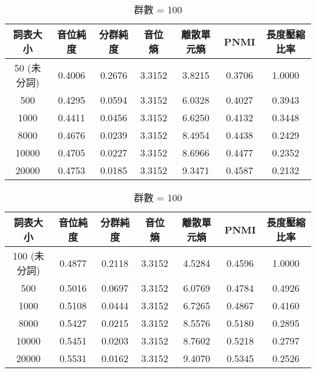 

\begin{table}[!htbp]
    \centering
    \begin{subtable}[t]{\textwidth}
        \centering
        \begin{tabular}{|c|c|c|c|c|c|c|} \hline 
                詞表大小  & 音位純度 & 分群純度 & 音位熵 & 離散單元熵 &    PNMI & 長度壓縮比率 \\ \hline 
 50 (未分詞)&  0.4006 &   0.2676 & 3.3152 &     3.8215 & 0.3706&1.0000\\ \hline 
                  500  &   0.4295&     0.0594    &3.3152 &   6.0328  &       0.4027 &0.3943 \\ \hline %
                 1000  &   0.4411&     0.0456    &3.3152 &   6.6250  &       0.4132 &0.3448 \\ \hline %
                 8000  &   0.4676&     0.0239    &3.3152 &   8.4954  &       0.4438 &0.2429 \\ \hline %
                10000  &   0.4705&     0.0227    &3.3152 &   8.6966  &       0.4477 &0.2352 \\ \hline %
                20000  &   0.4753&     0.0185    &3.3152 &   9.3471  &       0.4587 &0.2132 \\ \hline %
        \end{tabular}
\caption{群數 = 50}
        \label{tab:ch4-w2v2-phn-clu050}
    \end{subtable}        

    \jefftablesep        

    \begin{subtable}[t]{\textwidth}
        \centering
        \begin{tabular}{|c|c|c|c|c|c|c|} \hline 
                詞表大小  & 音位純度 & 分群純度 & 音位熵 & 離散單元熵 &    PNMI & 長度壓縮比率 \\ \hline 
 100 (未分詞)&0.4877 &   0.2118 & 3.3152 &     4.5284 & 0.4596&1.0000\\ \hline 
                  500  &   0.5016&     0.0697    &3.3152 &   6.0769  &       0.4784 &0.4926 \\ \hline %
                 1000  &   0.5108&     0.0444    &3.3152 &   6.7265  &       0.4867 &0.4160 \\ \hline %
                 8000  &   0.5427&     0.0215    &3.3152 &   8.5576  &       0.5180 &0.2895 \\ \hline %
                10000  &   0.5451&     0.0203    &3.3152 &   8.7602  &       0.5218 &0.2797 \\ \hline %
                20000  &   0.5531&     0.0162    &3.3152 &   9.4070  &       0.5345 &0.2526 \\ \hline %
        \end{tabular}
\caption{群數 = 100}
        \label{tab:ch4-w2v2-phn-clu100}
    \end{subtable}        


\end{table}
